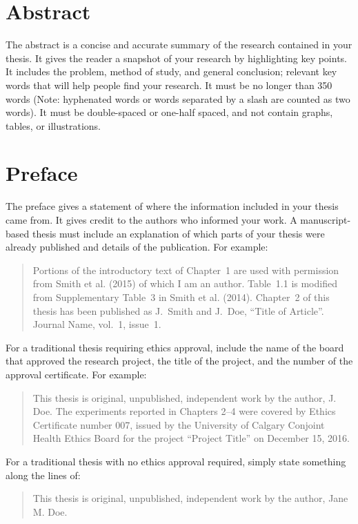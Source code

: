 
\chapter{Abstract}

The abstract is a concise and accurate summary of the research
contained in your thesis. It gives the reader a snapshot of your
research by highlighting key points. It includes the problem, method of
study, and general conclusion; relevant key words that will help
people find your research. It must be no longer than 350 words (Note:
hyphenated words or words separated by a slash are counted as two
words). It must be double-spaced or one-half spaced, and not contain
graphs, tables, or illustrations.

\chapter{Preface}

The preface gives a statement of where the information included in
your thesis came from. It gives credit to the authors who informed
your work.  A manuscript-based thesis must include an explanation of
which parts of your thesis were already published and details of the
publication. For example:
\begin{quote}
Portions of the introductory text of Chapter~1 are used with
permission from Smith et al. (2015) of which I am an author. Table~1.1
is modified from Supplementary Table~3 in Smith et
al. (2014). Chapter~2 of this thesis has been published as J.~Smith
and J.~Doe, ``Title of Article''. Journal Name, vol.~1, issue~1.
\end{quote}
For a traditional thesis requiring ethics approval, include the name
of the board that approved the research project, the title of the
project, and the number of the approval certificate. For example:
\begin{quote}
This thesis is original, unpublished, independent work by the author,
J. Doe.  The experiments reported in Chapters 2--4 were covered by
Ethics Certificate number 007, issued by the University of Calgary
Conjoint Health Ethics Board for the project ``Project Title'' on
December 15, 2016.
\end{quote}
For a traditional thesis with no ethics approval required, simply
state something along the lines of:
\begin{quote}
This thesis is original, unpublished, independent work by the author,
Jane M. Doe.
\end{quote}

